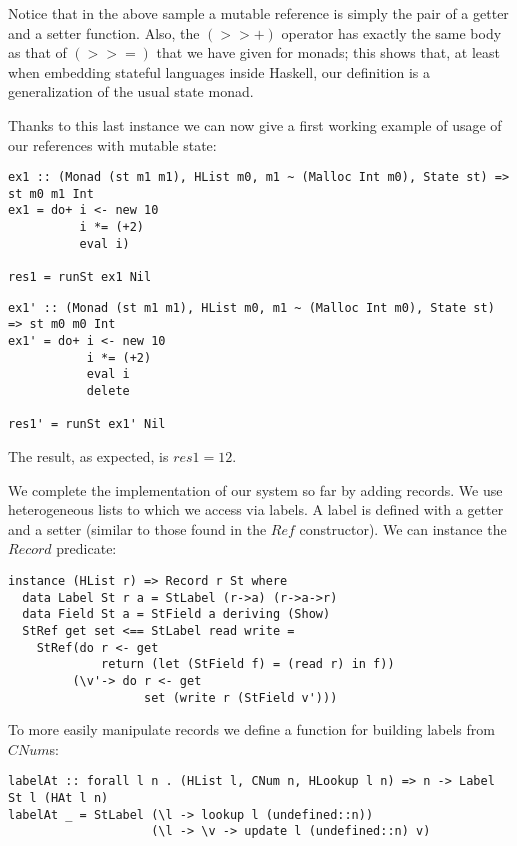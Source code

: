 Notice that in the above sample a mutable reference is 
simply the pair of a getter and a setter function. Also, the 
$(>>+)$ operator has exactly the same body as that of $(>>=)$ that we have given for monads; this shows that, at 
least when embedding stateful languages inside Haskell, our 
definition is a generalization of the usual state monad.

Thanks to this last instance we can now give a first working example of usage of our references with mutable state:
\begin{lstlisting}
ex1 :: (Monad (st m1 m1), HList m0, m1 ~ (Malloc Int m0), State st) => st m0 m1 Int
ex1 = do+ i <- new 10
          i *= (+2)
          eval i)

res1 = runSt ex1 Nil
\end{lstlisting}

\begin{lstlisting}
ex1' :: (Monad (st m1 m1), HList m0, m1 ~ (Malloc Int m0), State st) => st m0 m0 Int
ex1' = do+ i <- new 10
           i *= (+2)
           eval i
           delete

res1' = runSt ex1' Nil
\end{lstlisting}

The result, as expected, is $res1=12$.

We complete the implementation of our system so far by adding records. We use heterogeneous lists to which we access via labels. A label is defined with a getter and a setter (similar to those found in the $Ref$ constructor). We can instance the $Record$ predicate:
\begin{lstlisting}
instance (HList r) => Record r St where
  data Label St r a = StLabel (r->a) (r->a->r)
  data Field St a = StField a deriving (Show)
  StRef get set <== StLabel read write =
    StRef(do r <- get
             return (let (StField f) = (read r) in f))
         (\v'-> do r <- get
                   set (write r (StField v')))
\end{lstlisting}

To more easily manipulate records we define a function for building labels from $CNum$s:
\begin{lstlisting}
labelAt :: forall l n . (HList l, CNum n, HLookup l n) => n -> Label St l (HAt l n)
labelAt _ = StLabel (\l -> lookup l (undefined::n)) 
                    (\l -> \v -> update l (undefined::n) v)
\end{lstlisting}

